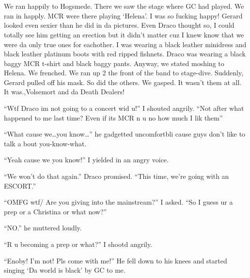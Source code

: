 \section{\chaptername~\thesection}



We ran happily to Hogsmede. There we saw the stage where GC had played. We ran in happly. MCR were there playing \enquote*{Helena}. I was so fucking happy! Gerard looked even sexier than he did in da pictures. Even Draco thought so, I could totally see him getting an erection but it didn't matter cuz I knew know that we were da only true ones for eachother. I was wearing a black leather minidress and black leather platinum boots with red ripped fishnets. Draco was wearing a black baggy MCR t-shirt and black baggy pants. Anyway, we stated moshing to Helena. We frenched. We ran up 2 the front of the band to stage-dive. Suddenly, Gerard pulled off his mask. So did the others. We gasped. It wasn't them at all. It was.,\dotfill Volsemort and da Death Dealers!

\enquote{Wtf Draco im not going to a concert wid u!} I shouted angrily. \enquote{Not after what happened to me last time? Even if its MCR n u no how much I lik them}

\begin{sloppypar}
    \enquote{What cause we\ldots you know\ldots} he gadgetted uncom\-fort\-bli cause guys don't like to talk a bout you-know-what.
\end{sloppypar}

\enquote{Yeah cause we you know!} I yielded in an angry voice.

\enquote{We won't do that again.} Draco promised. \enquote{This time, we're going with an ESCORT\@.}

\enquote{OMFG wtf/ Are you giving into the mainstream?} I asked. \enquote{So I guess ur a prep or a Christina or what now?}

\enquote{NO\@.} he muttered loudly.

\enquote{R u becoming a prep or what?} I shootd angrily.

\enquote{Enoby! I'm not! Pls come with me!} He fell down to his knees and started singing \enquote*{Da world is black} by GC to me.

